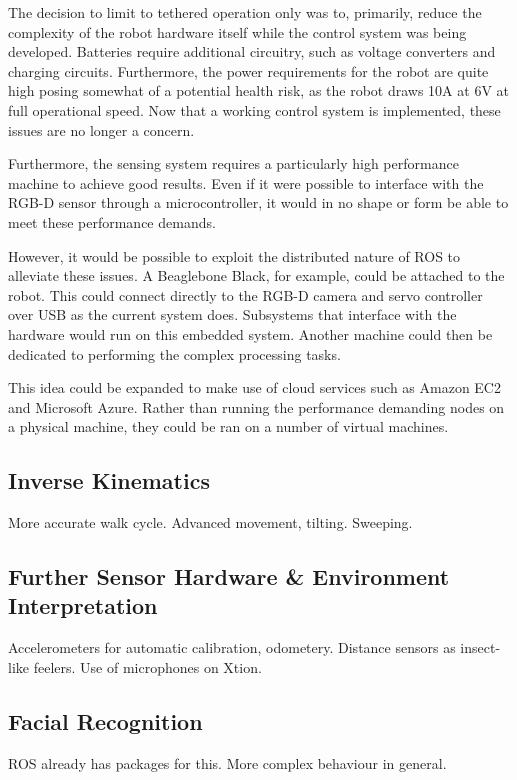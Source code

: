 The decision to limit to tethered operation only was to, primarily, reduce the complexity of the robot hardware itself while the control system was being developed. Batteries require additional circuitry, such as voltage converters and charging circuits. Furthermore, the power requirements for the robot are quite high posing somewhat of a potential health risk, as the robot draws 10A at 6V at full operational speed. Now that a working control system is implemented, these issues are no longer a concern.

Furthermore, the sensing system requires a particularly high performance machine to achieve good results. Even if it were possible to interface with the RGB-D sensor through a microcontroller, it would in no shape or form be able to meet these performance demands.

However, it would be possible to exploit the distributed nature of ROS to alleviate these issues. A Beaglebone Black, for example, could be attached to the robot. This could connect directly to the RGB-D camera and servo controller over USB as the current system does. Subsystems that interface with the hardware would run on this embedded system. Another machine could then be dedicated to performing the complex processing tasks.

This idea could be expanded to make use of cloud services such as Amazon EC2 and Microsoft Azure. Rather than running the performance demanding nodes on a physical machine, they could be ran on a number of virtual machines. 

\subsection{Inverse Kinematics}
More accurate walk cycle. Advanced movement, tilting. Sweeping.

\subsection{Further Sensor Hardware \& Environment Interpretation}
Accelerometers for automatic calibration, odometery. Distance sensors as insect-like feelers. Use of microphones on Xtion.  

\subsection{Facial Recognition}
ROS already has packages for this. More complex behaviour in general.